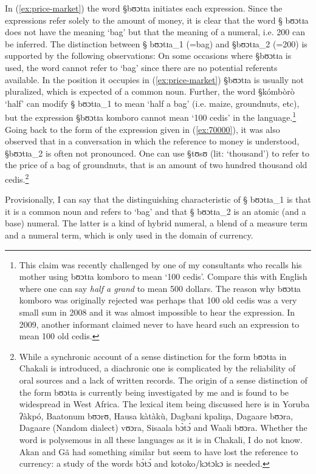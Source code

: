 In (\ref{ex:price-market}) the word {\S bʊɔtɪa} initiates  each expression.
Since the
expressions refer solely to the amount of money, it is clear that the word {\S
bʊɔtɪa} does not have the  meaning `bag' but that  the
meaning of a numeral, i.e. 200 can be inferred. The distinction between {\S
bʊɔtɪa}_{1} (=bag)
and {\S bʊɔtɪa}_{2} (=200) is supported by the following observations:  On some
occasions where  {\S bʊɔtɪa} is used,  the word cannot refer to `bag' since
there are no potential referents available. In the position it occupies in
(\ref{ex:price-market}) {\S bʊɔtɪa} is usually not pluralized, which is
expected of a common noun. Further, the word {\S kómbòrò} `half' can modify
{\S
bʊɔtɪa}_{1} to mean `half a bag' (i.e. maize, groundnuts, etc), but  the
expression {\S bʊɔtɪa komboro} cannot mean `100 cedis' in the
language.\footnote{This claim was recently challenged by one of my consultants
who recalls his  mother using  {\F bʊɔtɪa komboro} to mean `100 cedis'.  Compare
this with English  where one can say \textit{half a grand} to mean 500
dollars. The reason why {\F bʊɔtɪa komboro} was originally rejected was perhaps
that 100 old cedis was a very small sum  in 2008 and it was almost impossible
to hear the expression. In 2009,  another informant claimed never to have
heard such an expression to mean 100 old cedis.}  Going back to the form of the
expression given in
(\ref{ex:70000}),
it was also observed that in a conversation in which the reference to money is
understood, {\S bʊɔtɪa}_{2}  is often not pronounced. One can use {\S tʊsʊ}
(lit: `thousand') to refer to the price of a bag of groundnuts, that is an
amount of
two hundred thousand old cedis.\footnote{While a synchronic account of a sense
distinction for the form {\F bʊɔtɪa} in Chakali is introduced, a diachronic one
is complicated by the reliability of oral sources and a lack of written records.
The origin of a sense distinction of the form {\F bʊɔtɪa} is
currently being
investigated by me and is found to be widespread in West Africa.  The lexical
item being discussed here is in Yoruba {\F ʔàkpó}, Baatonum {\F bʊɔrʊ}, Hausa
{\F
kàtàkù},  Dagbani {\F kpaliŋa}, Dagaare {\F bʊɔra}, Dagaare (Nandom dialect)
{\F vʊɔra}, Sisaala {\F bɔ̀tɔ́} and Waali {\F bʊɔra}. Whether the word is
polysemous
in all these languages as it is in Chakali, I do not know. Akan and Gã had
something similar but seem to have lost the reference to currency: a study of
the words {\F  bɔ̀tɔ́} and {\F kotoko}/{\F kɔtɔkɔ}  is needed.}


Provisionally, I can say that the distinguishing characteristic of {\S
bʊɔtɪa}_{1} is that it is a common noun and refers to `bag' and that {\S
bʊɔtɪa}_{2} is an atomic (and a base) numeral. The latter is  a kind of hybrid
numeral, a blend of a measure term and a numeral term,   which is only used in
the domain of currency.

